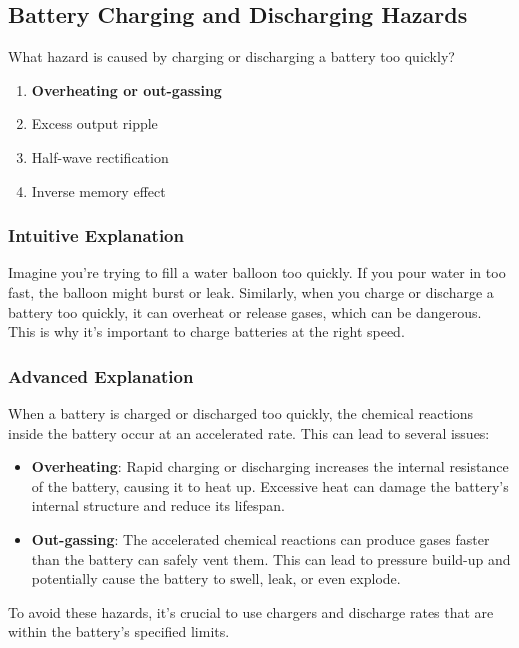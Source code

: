\subsection{Battery Charging and Discharging Hazards}
\label{T0A10}

\begin{tcolorbox}[colback=gray!10!white,colframe=black!75!black,title=T0A10]
What hazard is caused by charging or discharging a battery too quickly?
\begin{enumerate}[noitemsep]
    \item \textbf{Overheating or out-gassing}
    \item Excess output ripple
    \item Half-wave rectification
    \item Inverse memory effect
\end{enumerate}
\end{tcolorbox}

\subsubsection*{Intuitive Explanation}
Imagine you're trying to fill a water balloon too quickly. If you pour water in too fast, the balloon might burst or leak. Similarly, when you charge or discharge a battery too quickly, it can overheat or release gases, which can be dangerous. This is why it's important to charge batteries at the right speed.

\subsubsection*{Advanced Explanation}
When a battery is charged or discharged too quickly, the chemical reactions inside the battery occur at an accelerated rate. This can lead to several issues:
\begin{itemize}
    \item \textbf{Overheating}: Rapid charging or discharging increases the internal resistance of the battery, causing it to heat up. Excessive heat can damage the battery's internal structure and reduce its lifespan.
    \item \textbf{Out-gassing}: The accelerated chemical reactions can produce gases faster than the battery can safely vent them. This can lead to pressure build-up and potentially cause the battery to swell, leak, or even explode.
\end{itemize}
To avoid these hazards, it's crucial to use chargers and discharge rates that are within the battery's specified limits.